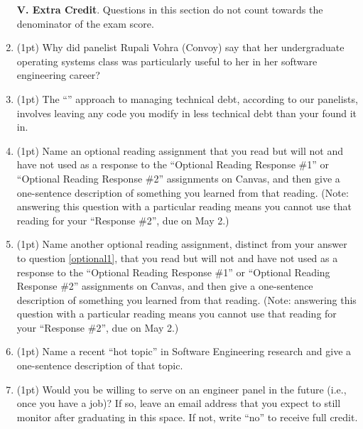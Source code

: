 \documentclass{report}
\newif\ifkey
\newcommand{\answershort}[1]{\ifkey\color{red}\underline{\textbf{#1}}\color{black}\else\underline{\hspace{3in}}\fi\xspace}
\newcommand{\answerlong}[1]{\ifkey\color{red}\textbf{#1}\color{black}\else\vspace{0.5in}\fi\xspace}
\newcommand{\ecpts}[1]{\addtocounter{ecpoints}{#1}(#1pt)}
\begin{document}
\begin{spacing}{1.4}
\begin{enumerate}[leftmargin=*]
    \newpage
    
    \textbf{V. Extra Credit}. Questions in this section do not count towards the denominator of the exam score.

  \item \ecpts{1} Why did panelist Rupali Vohra (Convoy) say that her undergraduate operating systems class
    was particularly useful to her in her software engineering career?
    \answerlong{Any answer involving the common-ness of distributed systems or the similarity between multithreading and distributed systems is acceptable.}

  \item \ecpts{1} The ``\answershort{campsite}'' approach to managing technical debt, according to our panelists, involves leaving any code you modify
    in less technical debt than your found it in.
  
  \item \ecpts{1} \label{optional1} Name an optional reading assignment that you read but will not and have not used as a response to the ``Optional Reading Response \#1''
    or ``Optional Reading Response \#2'' assignments on Canvas, and then give a one-sentence description of something you learned from that reading.
    (Note: answering this question with a particular reading means you cannot use that reading for your ``Response \#2'', due on May 2.)
    \answerlong{Answers vary.}
    
  \item \ecpts{1} Name another optional reading assignment, distinct from your answer to question \ref{optional1},
    that you read but will not and have not used as a response to the ``Optional Reading Response \#1''
    or ``Optional Reading Response \#2'' assignments on Canvas, and then give a one-sentence description of something you learned from that reading.
    (Note: answering this question with a particular reading means you cannot use that reading for your ``Response \#2'', due on May 2.)
    \answerlong{Answers vary.}
    
  \item \ecpts{1} Name a recent ``hot topic'' in Software Engineering research and give a one-sentence description of that topic.
    \answerlong{Expected answers are the topics covered in class on 20 April, but any topic on which there were 3 or more papers at FSE, ICSE, ISSTA, or ASE in the past 2 years
      is acceptable.}

  \item \ecpts{1} Would you be willing to serve on an engineer panel in the future (i.e., once you have a job)? If so, leave an email address that you expect to still monitor
    after graduating in this space. If not, write ``no'' to receive full credit.\answerlong{``no'' or any email address receives full credit.}
    

\end{enumerate}
\end{spacing}
\end{document}
